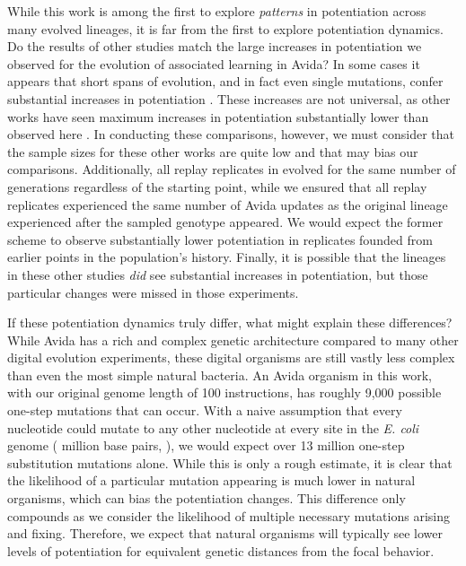 While this work is among the first to explore \textit{patterns} in potentiation across many evolved lineages, it is far from the first to explore potentiation dynamics. 
Do the results of other studies match the large increases in potentiation we observed for the evolution of associated learning in Avida? 
In some cases it appears that short spans of evolution, and in fact even single mutations, confer substantial increases in potentiation \citep{jochumsenEvolutionAntimicrobialPeptide2016a, covertiiiExperimentsRoleDeleterious2013}. 
These increases are not universal, as other works have seen maximum increases in potentiation substantially lower than observed here \citep{blountHistoricalContingencyEvolution2008}.
In conducting these comparisons, however, we must consider that the sample sizes for these other works are quite low and that may bias our comparisons.
Additionally, all replay replicates in \citep{blountHistoricalContingencyEvolution2008} evolved for the same number of generations regardless of the starting point, while we ensured that all replay replicates experienced the same number of Avida updates as the original lineage experienced after the sampled genotype appeared. 
We would expect the former scheme to observe substantially lower potentiation in replicates founded from earlier points in the population's history. 
Finally, it is possible that the lineages in these other studies \textit{did} see substantial increases in potentiation, but those particular changes were missed in those experiments. 

If these potentiation dynamics truly differ, what might explain these differences? 
While Avida has a rich and complex genetic architecture compared to many other digital evolution experiments, these digital organisms are still vastly less complex than even the most simple natural bacteria.
An Avida organism in this work, with our original genome length of 100 instructions, has roughly 9,000 possible one-step mutations that can occur. 
With a naive assumption that every nucleotide could mutate to any other nucleotide at every site in the \textit{E. coli} genome ( million base pairs, \citet{blattner1997complete}), we would expect over 13 million one-step substitution mutations alone. 
While this is only a rough estimate, it is clear that the likelihood of a particular mutation appearing is much lower in natural organisms, which can bias the potentiation changes. 
This difference only compounds as we consider the likelihood of multiple necessary mutations arising and fixing.
Therefore, we expect that natural organisms will typically see lower levels of potentiation for equivalent genetic distances from the focal behavior.

